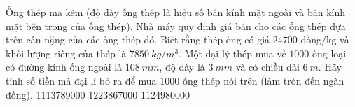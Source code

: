 \begin{ex}%
	Ống thép mạ kẽm (độ dày ống thép là hiệu số bán kính mặt ngoài và bán kính mặt bên trong của ống thép). Nhà máy quy định giá bán cho các ống thép dựa trên cân nặng của các ống thép đó. Biết rằng thép ống có giá $24700$ đồng/kg và khối lượng riêng của thép là $7850~kg/{m}^3$. Một đại lý thép mua về $1000$ ống loại có đường kính ống ngoài là $108~mm$, độ dày là $3~mm$ và có chiều dài $6~m$. Hãy tính số tiền mà đại lí bỏ ra để mua $1000$ ống thép nói trên (làm tròn đến ngàn đồng).
	\choice
	{}
	{1113789000}
	{1223867000}
	{1124980000}
\end{ex}

